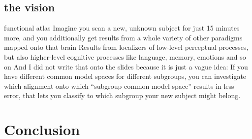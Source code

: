 \subsection{the vision}
%
functional atlas
%
Imagine you scan a new, unknown subject for just 15 minutes more, and you
additionally get results from a whole variety of other paradigms mapped onto
that brain
%
Results from localizers of low-level perceptual processes, but also higher-level
cognitive processes like language, memory, emotions and so on
%
And I did not write that onto the slides because it is just a vague idea:
%
If you have different common model spaces for different subgroups, you can
investigate which alignment onto which ``subgroup common model space'' results
in less error, that lets you classify to which subgroup your new subject might
belong.


\section{Conclusion}
